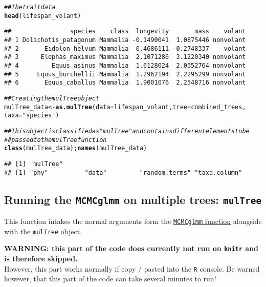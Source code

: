 \documentclass{article}\usepackage[]{graphicx}\usepackage[]{color}
\makeatletter
\newcommand{\hlstr}[1]{\textcolor[rgb]{0.192,0.494,0.8}{#1}}%
\newcommand{\hlcom}[1]{\textcolor[rgb]{0.678,0.584,0.686}{\textit{#1}}}%
\newcommand{\hlstd}[1]{\textcolor[rgb]{0.345,0.345,0.345}{#1}}%
\newcommand{\hlkwb}[1]{\textcolor[rgb]{0.69,0.353,0.396}{#1}}%
\newcommand{\hlkwc}[1]{\textcolor[rgb]{0.333,0.667,0.333}{#1}}%
\newcommand{\hlkwd}[1]{\textcolor[rgb]{0.737,0.353,0.396}{\textbf{#1}}}%
\newenvironment{kframe}{%
 \def\at@end@of@kframe{}%
 \ifinner\ifhmode%
  \def\at@end@of@kframe{\end{minipage}}%
  \begin{minipage}{\columnwidth}%
 \fi\fi%
 \def\FrameCommand##1{\hskip\@totalleftmargin \hskip-\fboxsep
 \colorbox{shadecolor}{##1}\hskip-\fboxsep
     \hskip-\linewidth \hskip-\@totalleftmargin \hskip\columnwidth}%
 \MakeFramed {\advance\hsize-\width
   \@totalleftmargin\z@ \linewidth\hsize
   \@setminipage}}%
 {\par\unskip\endMakeFramed%
 \at@end@of@kframe}
\newenvironment{knitrout}{}{} %
\makeatother
\begin{document}
\begin{knitrout}
\color{fgcolor}\begin{kframe}
\begin{alltt}
\hlcom{## The trait data}
\hlkwd{head}\hlstd{(lifespan_volant)}
\end{alltt}
\begin{verbatim}
##                species    class  longevity       mass    volant
## 1 Dolichotis_patagonum Mammalia -0.1490041  1.0875446 nonvolant
## 2       Eidolon_helvum Mammalia  0.4686111 -0.2748337    volant
## 3      Elephas_maximus Mammalia  2.1071286  3.1220340 nonvolant
## 4         Equus_asinus Mammalia  1.6128024  2.0352764 nonvolant
## 5     Equus_burchellii Mammalia  1.2962194  2.2295299 nonvolant
## 6       Equus_caballus Mammalia  1.9001076  2.2548716 nonvolant
\end{verbatim}
\begin{alltt}
\hlcom{## Creating the mulTree object}
\hlstd{mulTree_data} \hlkwb{<-} \hlkwd{as.mulTree}\hlstd{(}\hlkwc{data} \hlstd{= lifespan_volant,} \hlkwc{tree} \hlstd{= combined_trees,}
    \hlkwc{taxa} \hlstd{=} \hlstr{"species"}\hlstd{)}

\hlcom{## This object is classified as "mulTree" and contains different elements to be}
\hlcom{## passed to the mulTree function}
\hlkwd{class}\hlstd{(mulTree_data) ;} \hlkwd{names}\hlstd{(mulTree_data)}
\end{alltt}
\begin{verbatim}
## [1] "mulTree"
## [1] "phy"          "data"         "random.terms" "taxa.column"
\end{verbatim}
\end{kframe}
\end{knitrout}


\subsection{Running the \texttt{MCMCglmm} on multiple trees: \texttt{mulTree}}
This function intakes the normal arguments form the \href{http://cran.r-project.org/web/packages/MCMCglmm/index.html}{\texttt{MCMCglmm} function} alongside with the \texttt{mulTree} object.

\textbf{WARNING: this part of the code does currently not run on \texttt{knitr} and is therefore skipped.}\\
However, this part works normally if copy / pasted into the \texttt{R} console.
Be warned however, that this part of the code can take several minutes to run!
\end{document}
